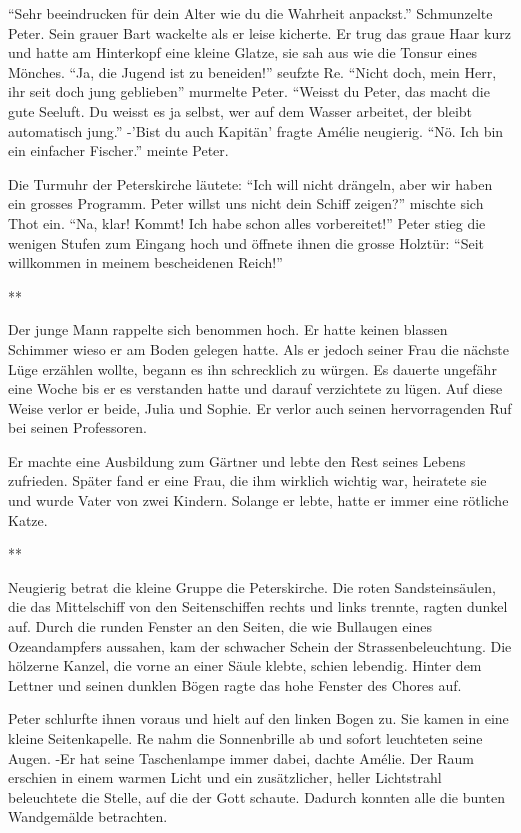 \documentclass[11pt,titlepage,a5paper]{book}
\newcommand{\sterne}{\par{\centering ***\par}}
\begin{document}
"`Sehr beeindrucken für dein Alter wie du die Wahrheit anpackst."' Schmunzelte Peter. Sein grauer Bart wackelte als er leise kicherte. Er trug das graue Haar kurz und hatte am Hinterkopf eine kleine Glatze, sie sah aus wie die Tonsur eines Mönches. "`Ja, die Jugend ist zu beneiden!"' seufzte Re. "`Nicht doch, mein Herr, ihr seit doch jung geblieben"' murmelte Peter. "`Weisst du Peter, das macht die gute Seeluft. Du weisst es ja selbst, wer auf dem Wasser arbeitet, der bleibt automatisch jung."' -'Bist du auch Kapitän' fragte Amélie neugierig. "`Nö. Ich bin ein einfacher Fischer."' meinte Peter.

Die Turmuhr der Peterskirche läutete: "`Ich will nicht drängeln, aber wir haben ein grosses Programm. Peter willst uns nicht dein Schiff zeigen?"' mischte sich Thot ein. "`Na, klar! Kommt! Ich habe schon alles vorbereitet!"' Peter stieg die wenigen Stufen zum Eingang hoch und öffnete ihnen die grosse Holztür: "`Seit willkommen in meinem bescheidenen Reich!"'

\sterne

Der junge Mann rappelte sich benommen hoch. Er hatte keinen blassen Schimmer wieso er am Boden gelegen hatte. Als er jedoch seiner Frau die nächste Lüge erzählen wollte, begann es ihn schrecklich zu würgen. Es dauerte ungefähr eine Woche bis er es verstanden hatte und darauf verzichtete zu lügen. Auf diese Weise verlor er beide, Julia und Sophie. Er verlor auch seinen hervorragenden Ruf bei seinen Professoren.

Er machte eine Ausbildung zum Gärtner und lebte den Rest seines Lebens zufrieden. Später fand er eine Frau, die ihm wirklich wichtig war, heiratete sie und wurde Vater von zwei Kindern. Solange er lebte, hatte er immer eine rötliche Katze.

\sterne

Neugierig betrat die kleine Gruppe die Peterskirche. Die roten Sandsteinsäulen, die das Mittelschiff von den Seitenschiffen rechts und links trennte, ragten dunkel auf. Durch die runden Fenster an den Seiten, die wie Bullaugen eines Ozeandampfers aussahen, kam der schwacher Schein der Strassenbeleuchtung. Die hölzerne Kanzel, die  vorne an einer Säule klebte, schien lebendig. Hinter dem Lettner und seinen dunklen Bögen ragte das hohe Fenster des Chores auf. 

Peter schlurfte ihnen voraus und hielt auf den linken Bogen zu. Sie kamen in eine kleine Seitenkapelle. Re nahm die Sonnenbrille ab und sofort leuchteten seine Augen. -Er hat seine Taschenlampe immer dabei, dachte Amélie. Der Raum erschien in einem warmen Licht und ein zusätzlicher, heller Lichtstrahl beleuchtete die Stelle, auf die der Gott schaute. Dadurch konnten alle die bunten Wandgemälde betrachten. 
\end{document}
